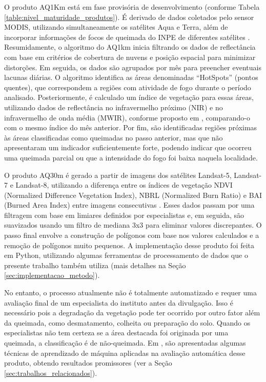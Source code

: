 \documentclass[cic,tc]{iiufrgs}
\begin{document}
O produto AQ1Km está em fase provisória de desenvolvimento (conforme Tabela \ref{table:nivel_maturidade_produtos}). É derivado de dados coletados pelo sensor MODIS, utilizando simultaneamente os satélites Aqua e Terra, além de incorporar informações de focos de queimada do INPE de diferentes satélites \citep{libonati2015algorithm}. Resumidamente, o algoritmo do AQ1km inicia filtrando os dados de reflectância com base em critérios de cobertura de nuvens e posição espacial para minimizar distorções. Em seguida, os dados são agrupados por mês para preencher eventuais lacunas diárias. O algoritmo identifica as áreas denominadas ``HotSpots'' (pontos quentes), que correspondem a regiões com atividade de fogo durante o período analisado. Posteriormente, é calculado um índice de vegetação para essas áreas, utilizando dados de reflectância no infravermelho próximo (NIR) e no infravermelho de onda média (MWIR), conforme proposto em \citet{libonati2011}, comparando-o com o mesmo índice do mês anterior. Por fim, são identificadas regiões próximas às áreas classificadas como queimadas no passo anterior, mas que não apresentaram um indicador suficientemente forte, podendo indicar que ocorreu uma queimada parcial ou que a intensidade do fogo foi baixa naquela localidade.

O produto AQ30m é gerado a partir de imagens dos satélites Landsat-5, Landsat-7 e Landsat-8, utilizando a diferença entre os índices de vegetação NDVI (Normalized Difference Vegetation Index), NBRL (Normalized Burn Ratio) e BAI (Burned Area Index) entre imagens consecutivas \citep{melchiori2014landsat}. Esses dados passam por uma filtragem com base em limiares definidos por especialistas e, em seguida, são suavizados usando um filtro de mediana 3x3 para eliminar valores discrepantes. O passo final envolve a construção de polígonos com base nos valores calculados e a remoção de polígonos muito pequenos. A implementação desse produto foi feita em Python, utilizando algumas ferramentas de processamento de dados que o presente trabalho também utiliza (mais detalhes na Seção \ref{sec:implementacao_metodo}). 

No entanto, o processo atualmente não é totalmente automatizado e requer uma avaliação final de um especialista do instituto antes da divulgação. Isso é necessário pois a degradação da vegetação pode ter ocorrido por outro fator além da queimada, como desmatamento, colheita ou preparação do solo. Quando os especialistas não tem certeza se a área destacada foi originada por uma queimada, a classificação é de não-queimada. Em \citet{dosclassificaccao}, são apresentadas algumas técnicas de aprendizado de máquina aplicadas na avaliação automática desse produto, obtendo resultados promissores (ver a Seção \ref{sec:trabalhos_relacionados}).
\end{document}
